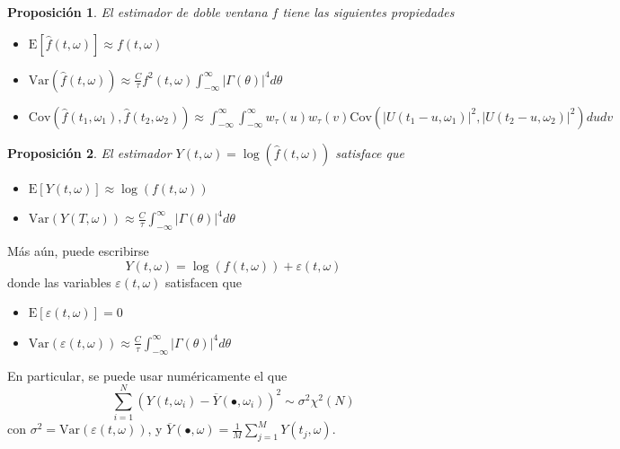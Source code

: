 \documentclass{beamer}
\newtheorem{prop}{Proposici\'on}
\newcommand{\intR}{\int_{-\infty}^{\infty}}
\newcommand{\est}[1]{\widehat{ #1 }}
\newcommand{\E}[1]{\mathrm{E}\left[ #1 \right]}
\newcommand{\Var}[1]{\mathrm{Var}\left( #1 \right)}
\newcommand{\Cov}[1]{\mathrm{Cov}\left( #1 \right)}
\newcommand{\abso}[1]{\left| #1 \right|}
\begin{document}
\begin{frame}%
\begin{prop}
El estimador de doble ventana $\widehat{f}$ tiene las siguientes propiedades
\begin{itemize}
\item $\displaystyle \E{\est{f}(t,\omega)} \approx f(t,\omega)$
\item $\displaystyle \Var{\est{f}(t,\omega)} \approx 
\frac{C}{\tau} f^{2}(t,\omega) \intR \abso{\Gamma (\theta)}^{4} d\theta$
\item $\displaystyle \Cov{\est{f}(t_1,\omega_1) , \est{f}(t_2,\omega_2)} \approx \intR \intR
w_\tau (u) w_\tau(v) \Cov{ \abso{U(t_1-u,\omega_1)}^{2} , \abso{U(t_2-u,\omega_2)}^{2} } du dv$
\end{itemize}
\end{prop}

\begin{prop}
El estimador $ Y(t,\omega) = \log{\left( \est{f}(t,\omega)\right)}$ satisface que
\begin{itemize}
\item $\displaystyle 
\E{ Y(t,\omega) } \approx \log \left( f(t,\omega) \right)$
\item $\displaystyle 
\Var{ Y(T,\omega) } 
\approx \frac{C}{\tau} \intR \abso{\Gamma (\theta)}^{4} d\theta $
\end{itemize}
\end{prop}
\end{frame}


\begin{frame}%
M\'as a\'un, puede escribirse
\begin{equation*}
Y(t,\omega) = \log \left( f(t,\omega) \right) + \varepsilon(t,\omega)
\end{equation*}
donde las variables $\varepsilon(t,\omega)$ satisfacen que
\begin{itemize}
\item $\displaystyle \E{\varepsilon(t,\omega)} = 0$
\item $\displaystyle \Var{\varepsilon(t,\omega)}
\approx \frac{C}{\tau} \intR \abso{\Gamma (\theta)}^{4} d\theta$
\end{itemize}

En particular, se puede usar num\'ericamente el que
\begin{equation*}
\sum_{i = 1 }^{N} \left( Y(t,\omega_i) - \overline{Y}(\bullet,\omega_i) \right)^{2} 
\sim \sigma^{2} \chi^{2}(N)
\end{equation*}
con $\sigma^{2} = \Var{\varepsilon(t,\omega)}$, y
$\overline{Y}(\bullet,\omega) = \frac{1}{M} \sum_{j=1}^{M} Y(t_j,\omega)$.
\end{frame}
\end{document}
